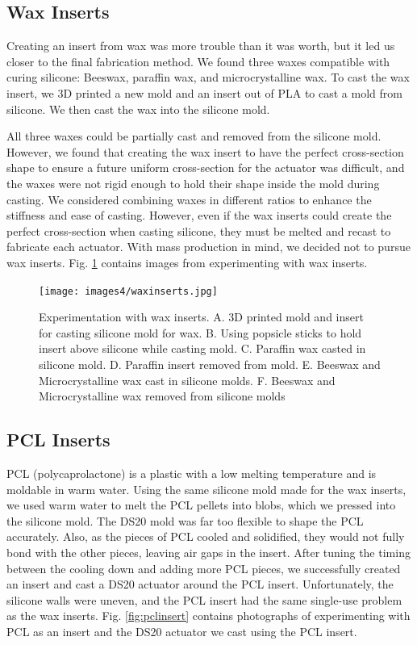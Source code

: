 \clearpage
\subsection{Wax Inserts}
Creating an insert from wax was more trouble than it was worth, but it led us closer to the final fabrication method. We found three waxes compatible with curing silicone: Beeswax, paraffin wax, and microcrystalline wax. To cast the wax insert, we 3D printed a new mold and an insert out of PLA to cast a mold from silicone. We then cast the wax into the silicone mold. 

All three waxes could be partially cast and removed from the silicone mold. However, we found that creating the wax insert to have the perfect cross-section shape to ensure a future uniform cross-section for the actuator was difficult, and the waxes were not rigid enough to hold their shape inside the mold during casting. We considered combining waxes in different ratios to enhance the stiffness and ease of casting. However, even if the wax inserts could create the perfect cross-section when casting silicone, they must be melted and recast to fabricate each actuator. With mass production in mind, we decided not to pursue wax inserts. Fig. \ref{fig:waxinserts} contains images from experimenting with wax inserts. 

\begin{figure}[ht]
    \centering
    \texttt{[image: images4/waxinserts.jpg]}
    \caption{Experimentation with wax inserts. A. 3D printed mold and insert for casting silicone mold for wax. B. Using popsicle sticks to hold insert above silicone while casting mold. C. Paraffin wax casted in silicone mold. D. Paraffin insert removed from mold. E. Beeswax and Microcrystalline wax cast in silicone molds. F. Beeswax and Microcrystalline wax removed from silicone molds}
    \label{fig:waxinserts}
\end{figure}

\clearpage
\subsection{PCL Inserts}
PCL (polycaprolactone) is a plastic with a low melting temperature and is moldable in warm water. Using the same silicone mold made for the wax inserts, we used warm water to melt the PCL pellets into blobs, which we pressed into the silicone mold. The DS20 mold was far too flexible to shape the PCL accurately. Also, as the pieces of PCL cooled and solidified, they would not fully bond with the other pieces, leaving air gaps in the insert. After tuning the timing between the cooling down and adding more PCL pieces, we successfully created an insert and cast a DS20 actuator around the PCL insert. Unfortunately, the silicone walls were uneven, and the PCL insert had the same single-use problem as the wax inserts. Fig. \ref{fig:pclinsert} contains photographs of experimenting with PCL as an insert and the DS20 actuator we cast using the PCL insert.

